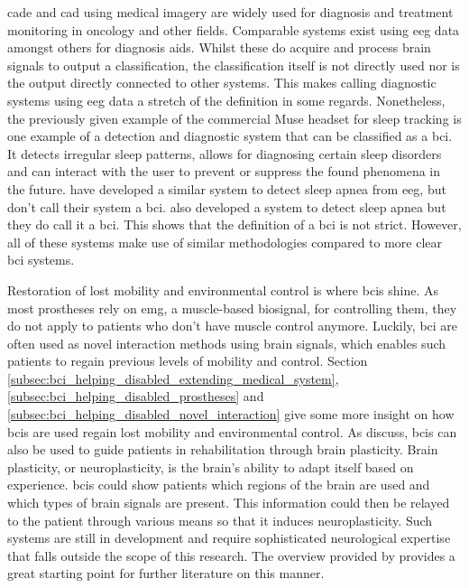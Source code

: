 \Gls{cade} and \gls{cad} using medical imagery are widely used for diagnosis and treatment monitoring in oncology and other fields.
Comparable systems exist using \gls{eeg} data amongst others for diagnosis aids.
Whilst these do acquire and process brain signals to output a classification, the classification itself is not directly used nor is the output directly connected to other systems.
This makes calling diagnostic systems using \gls{eeg} data a stretch of the definition in some regards.
Nonetheless, the previously given example of the commercial Muse headset for sleep tracking is one example of a detection and diagnostic system that can be classified as a \gls{bci}.
It detects irregular sleep patterns, allows for diagnosing certain sleep disorders and can interact with the user to prevent or suppress the found phenomena in the future.
 have developed a similar system to detect sleep apnea from \gls{eeg}, but don't call their system a \gls{bci}.
 also developed a system to detect sleep apnea but they do call it a \gls{bci}.
This shows that the definition of a \gls{bci} is not strict.
However, all of these systems make use of similar methodologies compared to more clear \gls{bci} systems.



Restoration of lost mobility and environmental control is where \glspl{bci} shine.
As most prostheses rely on \gls{emg}, a muscle-based \gls{biosignal}, for controlling them, they do not apply to patients who don't have muscle control anymore.
Luckily, \gls{bci} are often used as novel interaction methods using brain signals, which enables such patients to regain previous levels of mobility and control.
Section \ref{subsec:bci_helping_disabled_extending_medical_system}, \ref{subsec:bci_helping_disabled_prostheses} and \ref{subsec:bci_helping_disabled_novel_interaction} give some more insight on how \glspl{bci} are used regain lost mobility and environmental control.
As \citet{bci_rehabilitation} discuss, \glspl{bci} can also be used to guide patients in rehabilitation through brain plasticity.
Brain plasticity, or neuroplasticity, is the brain's ability to adapt itself based on experience.
\Glspl{bci} could show patients which regions of the brain are used and which types of brain signals are present.
This information could then be relayed to the patient through various means so that it induces neuroplasticity.
Such systems are still in development and require sophisticated neurological expertise that falls outside the scope of this research.
The overview provided by \citet{bci_rehabilitation} provides a great starting point for further literature on this manner.

